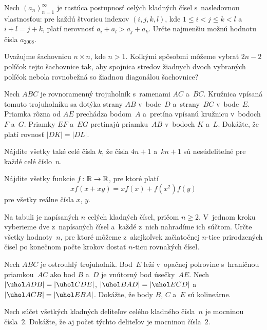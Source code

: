 {%
Nech $(a_n)_{n=1}^\infty$ je rastúca postupnosť celých kladných čísel s~nasledovnou vlastnosťou: pre každú štvoricu indexov $(i,j,k,l)$, kde $1\le i<j\le k<l$ a~$i+l=j+k$, platí nerovnosť $a_i+a_l>a_j+a_k$. Určte najmenšiu možnú hodnotu čísla $a_{2008}$.}

{%
Uvažujme šachovnicu $n\times n$, kde $n>1$. Koľkými spôsobmi môžeme vybrať $2n-2$ políčok tejto šachovnice tak, aby spojnica stredov žiadnych dvoch vybraných políčok nebola rovnobežná so žiadnou diagonálou šachovnice?}

{%
Nech $ABC$ je rovnoramenný trojuholník s~ramenami $AC$ a~$BC$. Kružnica vpísaná tomuto trojuholníku sa dotýka strany $AB$ v~bode~$D$ a~strany~$BC$ v~bode~$E$. Priamka rôzna od $AE$ prechádza bodom~$A$ a~pretína vpísanú kružnicu v~bodoch $F$ a~$G$. Priamky $EF$ a~$EG$ pretínajú priamku~$AB$ v~bodoch $K$ a~$L$. Dokážte, že platí rovnosť $|DK|=|DL|$.}

{%
Nájdite všetky také celé čísla $k$, že čísla $4n+1$ a~$kn+1$ sú nesúdeliteľné pre každé celé číslo~$n$.}

{%
Nájdite všetky funkcie $f\colon \Bbb R \to \Bbb R$, pre ktoré platí
$$
xf(x+xy)=xf(x)+f(x^2)f(y)
$$
pre všetky reálne čísla $x$, $y$.}

{%
Na tabuli je napísaných $n$ celých kladných čísel, pričom $n\ge2$. V~jednom kroku vyberieme dve z~napísaných čísel a~každé z~nich nahradíme ich súčtom.
Určte všetky hodnoty~$n$, pre ktoré môžeme z~akejkoľvek začiatočnej $n$-tice prirodzených čísel po konečnom počte krokov dostať $n$-ticu rovnakých čísel.}

{%
Nech $ABC$ je ostrouhlý trojuholník. Bod~$E$ leží v~opačnej polrovine s~hraničnou priamkou~$AC$ ako bod $B$ a~$D$ je vnútorný bod úsečky~$AE$. Nech $|\uhol ADB|=|\uhol CDE|$, $|\uhol BAD|=|\uhol ECD|$ a~$|\uhol ACB|=|\uhol EBA|$. Dokážte, že body $B$, $C$ a~$E$ sú kolineárne.}

{%
Nech súčet všetkých kladných deliteľov celého kladného čísla~$n$ je mocninou čísla~$2$. Dokážte, že aj počet týchto deliteľov je mocninou čísla~$2$.}
